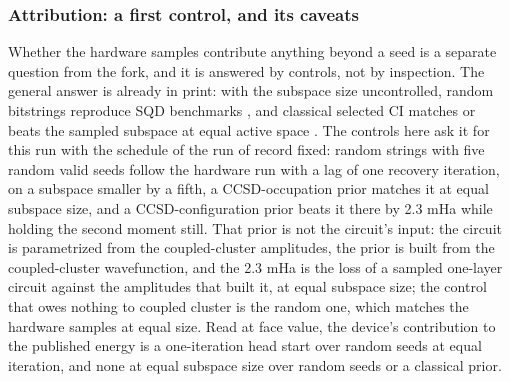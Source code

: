 \documentclass[11pt]{article}
\begin{document}
\subsubsection{Attribution: a first control, and its caveats}\label{sec:3.7.6}


Whether the hardware samples contribute anything beyond a seed is a separate question from the fork, and it is answered by controls, not by inspection. The general answer is already in print: with the subspace size uncontrolled, random bitstrings reproduce SQD benchmarks \cite{vanRossum2026}, and classical selected CI matches or beats the sampled subspace at equal active space \cite{Bonilla2026a}. The controls here ask it for this run with the schedule of the run of record fixed: random strings with five random valid seeds follow the hardware run with a lag of one recovery iteration, on a subspace smaller by a fifth, a CCSD-occupation prior matches it at equal subspace size, and a CCSD-configuration prior beats it there by 2.3 mHa while holding the second moment still. That prior is not the circuit's input: the circuit is parametrized from the coupled-cluster amplitudes, the prior is built from the coupled-cluster wavefunction, and the 2.3 mHa is the loss of a sampled one-layer circuit against the amplitudes that built it, at equal subspace size; the control that owes nothing to coupled cluster is the random one, which matches the hardware samples at equal size. Read at face value, the device's contribution to the published energy is a one-iteration head start over random seeds at equal iteration, and none at equal subspace size over random seeds or a classical prior.
\end{document}

